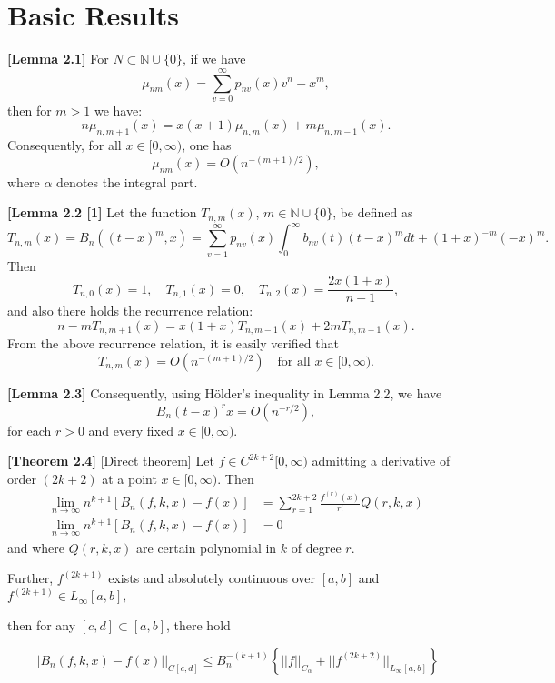 \documentclass[12pt]{article}
\begin{document}
\section{Basic Results}

\begin{lemma} \textbf{[Lemma 2.1]}
For $N \subset \mathbb{N} \cup \{0\}$, if we have
\[
    \mu_{nm}(x) = \sum_{v=0}^{\infty} p_{nv}(x) v^n - x^m,
\]
then for $m > 1$ we have:
\[
    n\mu_{n, m+1}(x) = x(x+1)\mu_{n, m}(x) + m\mu_{n, m-1}(x).
\]
Consequently, for all $x \in [0, \infty)$, one has
\[
    \mu_{nm}(x) = O(n^{-(m+1)/2}),
\]
where $\alpha$ denotes the integral part.
\end{lemma}

\begin{lemma}\textbf{[Lemma 2.2 [1]}
Let the function $T_{n, m}(x)$, $m \in \mathbb{N} \cup \{0\}$, be defined as
\[
    T_{n, m}(x) = B_n((t - x)^m, x) = \sum_{v=1}^{\infty} p_{nv}(x) \int_{0}^{\infty} b_{nv}(t) (t - x)^m dt + (1+x)^{-m} (-x)^m.
\]
Then 
\[
    T_{n, 0}(x) = 1, \quad T_{n, 1}(x) = 0, \quad T_{n, 2}(x) = \frac{2x(1+x)}{n-1},
\]
and also there holds the recurrence relation:
\[
    n - mT_{n, m+1}(x) = x(1+x)T_{n, m-1}(x) + 2mT_{n, m-1}(x).
\]
From the above recurrence relation, it is easily verified that
\[
    T_{n, m}(x) = O(n^{-(m+1)/2}) \quad \text{for all } x \in [0, \infty).
\]
\end{lemma}

\begin{lemma}\textbf{[Lemma 2.3]}
Consequently, using Hölder’s inequality in Lemma 2.2, we have
\[
    B_n(t - x)^r x = O(n^{-r/2}),
\]
for each $r > 0$ and every fixed $x \in [0, \infty)$.
\end{lemma}

\begin{theorem}\textbf{[Theorem 2.4]}
[Direct theorem]
Let $f \in C^{2k+2}[0,\infty)$ admitting a derivative of order $(2k+2)$ at a point $x \in [0,\infty)$. Then
\begin{align*}
\lim_{n\to\infty} n^{k+1} \left[ B_{n}(f,k,x) - f(x) \right] &= \sum_{r=1}^{2k+2} \frac{f^{(r)}(x)}{r!} Q(r,k,x) \\
\lim_{n\to\infty} n^{k+1} \left[ B_{n}(f,k,x) - f(x) \right] &= 0
\end{align*}
and
where $Q(r, k, x)$ are certain polynomial in $k$ of degree $r$.

Further, $f^{(2k+1)}$ exists and absolutely continuous over $[a, b]$ and $f^{(2k+1)} \in L_{\infty}[a,b],$

then for any $[c, d] \subset [a, b]$, there hold

\[ ||B_{n}(f, k, x) - f(x)||_{C[c,d]} \leq B_{n}^{-(k+1)} \left\{ ||f||_{C_{\alpha}} + ||f^{(2k+2)}||_{L_{\infty}[a,b]} \right\} \]
\end{theorem}
\end{document}
